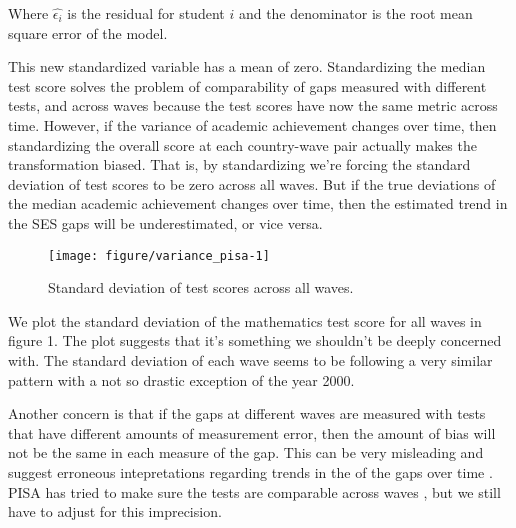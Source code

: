 \documentclass[11pt, a4paper]{article}\usepackage[]{graphicx}\usepackage[]{color}
\begin{document}

Where \begin{math}\hat{\epsilon_i}\end{math} is the residual for student \begin{math}i\end{math} and the denominator is the root mean square error of the model.

This new standardized variable has a mean of zero. Standardizing the median test score solves the problem of comparability of gaps measured with different tests, and across waves because the test scores have now the same metric across time. However, if the variance of academic achievement changes over time, then standardizing the overall score at each country-wave pair actually makes the transformation biased. That is, by standardizing we're forcing the standard deviation of test scores to be zero across all waves. But if the true deviations of the median academic achievement changes over time, then the estimated trend in the SES gaps will be underestimated, or vice versa.

\begin{figure}
\begin{center}


{\centering \texttt{[image: figure/variance\_pisa-1]} 

}



\caption{Standard deviation of test scores across all waves.}
\end{center}
\end{figure}

We plot the standard deviation of the mathematics test score for all waves in figure 1. The plot suggests that it's something we shouldn't be deeply concerned with. The standard deviation of each wave seems to be following a very similar pattern with a not so drastic exception of the year 2000.

Another concern is that if the gaps at different waves are measured with tests that have different amounts of measurement error, then the amount of bias will not be the same in each measure of the gap. This can be very misleading and suggest erroneous intepretations regarding trends in the of the gaps over time \citep{reardon2011}. PISA has tried to make sure the tests are comparable across waves \citep{pisa2012_technical}, but we still have to adjust for this imprecision.
\end{document}
